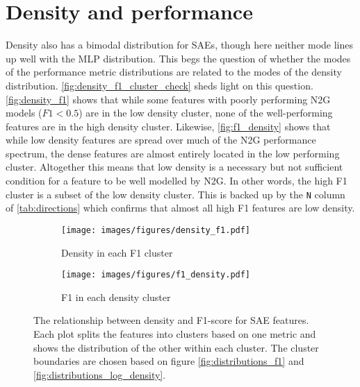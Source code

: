 \section{Density and performance}
Density also has a bimodal distribution for \acp{SAE}, though here neither mode lines up well with the \ac{MLP} distribution.
This begs the question of whether the modes of the performance metric distributions are related to the modes of the density distribution.
\autoref{fig:density_f1_cluster_check} sheds light on this question.
\autoref{fig:density_f1} shows that while some features with poorly performing \ac{N2G} models ($F1<0.5$) are in the low density cluster, none of the well-performing features are in the high density cluster.
Likewise, \autoref{fig:f1_density} shows that while low density features are spread over much of the \ac{N2G} performance spectrum, the dense features are almost entirely located in the low performing cluster.
Altogether this means that low density is a necessary but not sufficient condition for a feature to be well modelled by \ac{N2G}.
In other words, the high F1 cluster is a subset of the low density cluster.
This is backed up by the \texttt{N} column of \autoref{tab:directions} which confirms that almost all high F1 features are low density.

\begin{figure}[ht]
    \centering
    
    \begin{subfigure}[b]{0.45\textwidth}
        \centering
        \texttt{[image: images/figures/density\_f1.pdf]}
        \caption{Density in each F1 cluster}
        \label{fig:density_f1}
    \end{subfigure}
    \begin{subfigure}[b]{0.45\textwidth}
        \centering
        \texttt{[image: images/figures/f1\_density.pdf]}
        \caption{F1 in each density cluster}
        \label{fig:f1_density}
    \end{subfigure}
    
    \caption{The relationship between density and F1-score for \ac{SAE} features.
    Each plot splits the features into clusters based on one metric and shows the distribution of the other within each cluster.
    The cluster boundaries are chosen based on figure \ref{fig:distributions_f1} and \ref{fig:distributions_log_density}.}
    \label{fig:density_f1_cluster_check}
\end{figure}

